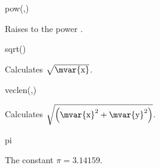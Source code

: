 \begin{math-function}{pow(,)}

 Raises  to the power . 

\begin{codeexample}[]
 \pgfmathresult
\end{codeexample}

\end{math-function}

\begin{math-function}{sqrt()}

 Calculates $\sqrt{\textrm{\mvar{x}}}$.

\begin{codeexample}[]
 \pgfmathresult
\end{codeexample}

\begin{codeexample}[]
  \pgfmathresult
\end{codeexample}

\end{math-function}

\begin{math-function}{veclen(,)}

 Calculates $\sqrt{\left(\textrm{\mvar{x}}^2+\textrm{\mvar{y}}^2\right)}$.

\begin{codeexample}[]
 \pgfmathresult
\end{codeexample}

\end{math-function}

\begin{math-constant}{pi}

	The constant $\pi=3.14159$.
	
\begin{codeexample}[]
 \pgfmathresult
\end{codeexample}

\begin{codeexample}[]
 \pgfmathresult
\end{codeexample}

\end{math-constant}

